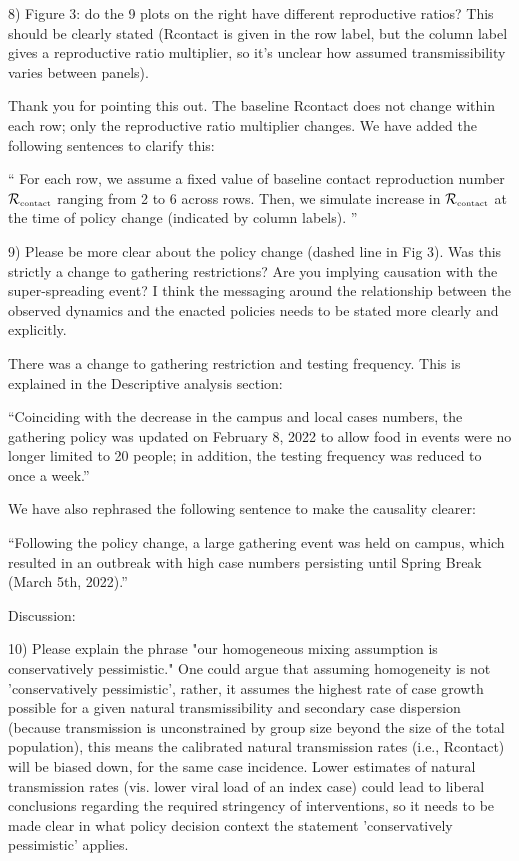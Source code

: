 \documentclass[12pt]{article}
\newcommand{\Rx}[1]{\ensuremath{{\mathcal R}_{#1}}}
\newcommand{\Rc}{\Rx{\textrm{\tiny{contact}}}}
\newcommand{\revtext}{\textsf}
\begin{document}
\revtext{8) Figure 3: do the 9 plots on the right have different reproductive ratios? This should be clearly stated (Rcontact is given in the row label, but the column label gives a reproductive ratio multiplier, so it's unclear how assumed transmissibility varies between panels).}

Thank you for pointing this out. The baseline Rcontact does not change within each row; only the reproductive ratio multiplier changes. 
We have added the following sentences to clarify this:

``
For each row, we assume a fixed value of baseline contact reproduction number $\Rc$ ranging from 2 to 6 across rows.
Then, we simulate increase in $\Rc$ at the time of policy change (indicated by column labels).
''

\revtext{9) Please be more clear about the policy change (dashed line in Fig 3). Was this strictly a change to gathering restrictions? Are you implying causation with the super-spreading event? I think the messaging around the relationship between the observed dynamics and the enacted policies needs to be stated more clearly and explicitly.} 

There was a change to gathering restriction and testing frequency. This is explained in the Descriptive analysis section:

``Coinciding with the decrease in the campus and local cases numbers, the gathering policy was updated on February 8, 2022 to allow food in events were no longer limited to 20 people;
in addition, the testing frequency was reduced to once a week.''

We have also rephrased the following sentence to make the causality clearer:

``Following the policy change, a large gathering event was held on campus, which resulted in an outbreak with high case numbers persisting until Spring Break (March 5th, 2022).''

\revtext{Discussion:}

\revtext{10) Please explain the phrase "our homogeneous mixing assumption is conservatively pessimistic." One could argue that assuming homogeneity is not 'conservatively pessimistic', rather, it assumes the highest rate of case growth possible for a given natural transmissibility and secondary case dispersion (because transmission is unconstrained by group size beyond the size of the total population), this means the calibrated natural transmission rates (i.e., Rcontact) will be biased down, for the same case incidence. Lower estimates of natural transmission rates (vis. lower viral load of an index case) could lead to liberal conclusions regarding the required stringency of interventions, so it needs to be made clear in what policy decision context the statement 'conservatively pessimistic' applies.}
\end{document}
